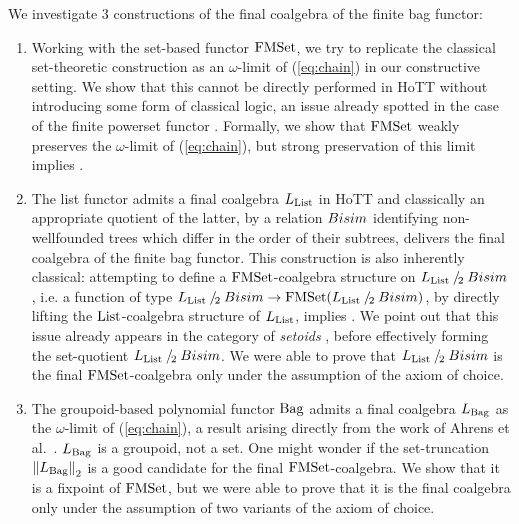 \documentclass[a4paper,USenglish,cleveref]{lipics-v2021}
\begin{document}
We investigate 3 constructions of the final coalgebra of the finite bag functor:
\begin{enumerate}
\item Working with the set-based functor $\FMSet$, we try to replicate the classical set-theoretic construction as an $\omega$-limit of (\ref{eq:chain}) in our constructive setting. We show that this cannot be directly performed in HoTT without introducing some form of classical logic, an issue already spotted in the case of the finite powerset functor \cite{Veltri2021}. Formally, we show that $\FMSet$ weakly preserves the $\omega$-limit of (\ref{eq:chain}),
but strong preservation of this limit implies \LLPO{}.
\item The list functor admits a final coalgebra $\Lim{\List}$ in HoTT \cite{Ahrens2015} and classically an appropriate quotient of the latter, by a relation $\Bisim$ identifying non-wellfounded trees which differ in the order of their subtrees, delivers the final coalgebra of the finite bag functor.
  This construction is also inherently classical: attempting to define a $\FMSet$-coalgebra structure on $\Lim{\List} \mathbin{/_{\!2}} \Bisim$, i.e. a function of type $\Lim{\List} \mathbin{/_{\!2}} \Bisim \to \FMSet (\Lim{\List} \mathbin{/_{\!2}} \Bisim)$, by directly lifting the $\List$-coalgebra structure of $\Lim{\List}$, implies \LLPO{}. We point out that this issue already appears in the category of \emph{setoids} \cite{Barthe2003}, before effectively forming the set-quotient $\Lim{\List} \mathbin{/_{\!2}} \Bisim$.
  We were able to prove that $\Lim{\List} \mathbin{/_{\!2}} \Bisim$ is the final $\FMSet$-coalgebra only under the assumption of the axiom of choice. 
\item The groupoid-based polynomial functor $\Bag$ admits a final coalgebra $\Lim{\Bag}$ as the $\omega$-limit of (\ref{eq:chain}), a result arising directly from the work of Ahrens et al.~\cite{Ahrens2015}. $\Lim{\Bag}$ is a groupoid, not a set. One might wonder if the set-truncation $\SetTrunc{\Lim{\Bag}}$ is a good candidate for the final $\FMSet$-coalgebra. We show that it is a fixpoint of $\FMSet$, but we were able to prove that it is the final coalgebra only under the assumption of two variants of the axiom of choice. 
\end{enumerate}
\end{document}
